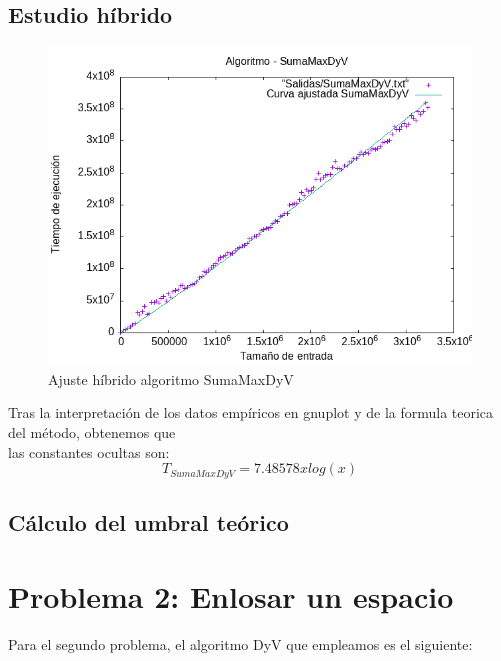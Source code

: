 \documentclass[11pt,openany]{book}
\begin{document}
\subsection{Estudio híbrido}
\begin{center}
      \begin{figure}[H]
            \centering
            \includegraphics[width=0.7\linewidth]{assets/Img/SumaMaxDyV_hib.png}
            \caption{Ajuste híbrido algoritmo SumaMaxDyV}
            \label{fig:sumaMax}
      \end{figure}
\end{center}
Tras la interpretación de los datos empíricos en gnuplot y de la formula teorica del método, obtenemos que \\
las constantes ocultas son:
\begin{equation*}
      T_{SumaMaxDyV}=7.48578x log(x)
\end{equation*}
\subsection{Cálculo del umbral teórico}

\newpage
\section{Problema 2: Enlosar un espacio }
Para el segundo problema, el algoritmo DyV que empleamos es el siguiente:
\end{document}
